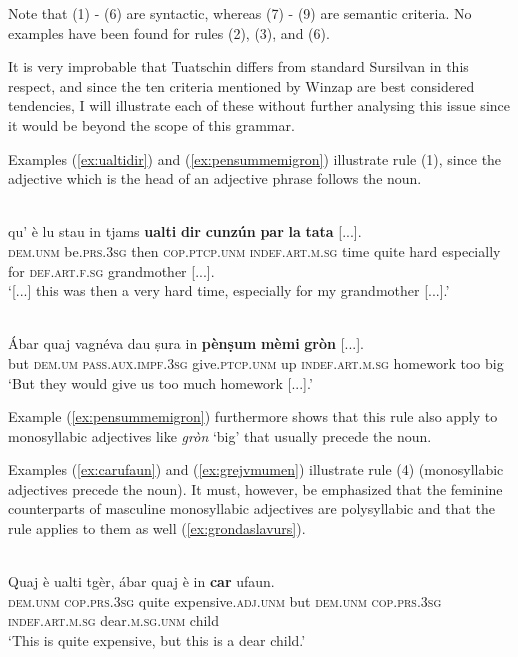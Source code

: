 Note that (1) - (6) are syntactic, whereas (7) - (9) are semantic criteria. No examples have been found for rules (2), (3), and (6).

It is very improbable that Tuatschin differs from standard Sursilvan in this respect, and since the ten criteria mentioned by Winzap are best considered tendencies, I will illustrate each of these without further analysing this issue since it would be beyond the scope of this grammar.

Examples (\ref{ex:ualtidir}) and (\ref{ex:pensummemigron}) illustrate rule (1), since the adjective which is the head of an adjective phrase follows the noun.
 
\ea
\label{ex:ualtidir}
\\
\gll  [...] qu’ è lu stau in tjams \textbf{ualti} \textbf{dir} \textbf{cunzún} \textbf{par} \textbf{la} \textbf{tata} [...]. \\
{} \textsc{dem.unm} be.\textsc{prs.3sg} then \textsc{cop.ptcp.unm} \textsc{indef.art.m.sg} time quite hard especially for \textsc{def.art.f.sg} grandmother [...].\\
\glt `[...] this was then a very hard time, especially for my grandmother [...].'
\z

\ea
\label{ex:pensummemigron}
\\
\gll  Ábar quaj vagnéva dau ṣura in \textbf{pènṣum} \textbf{mèmi} \textbf{gròn} [...].  \\
but \textsc{dem.um} \textsc{pass.aux.impf.3sg} give.\textsc{ptcp.unm} up \textsc{indef.art.m.sg} homework too big\\
\glt `But they would give us too much homework [...].'
\z

Example (\ref{ex:pensummemigron}) furthermore shows that this rule also apply to monosyllabic adjectives like \textit{gròn} `big' that usually precede the noun.

Examples (\ref{ex:carufaun}) and (\ref{ex:grejvmumen}) illustrate rule (4) (monosyllabic adjectives precede the noun). It must, however, be emphasized that the feminine counterparts of masculine monosyllabic adjectives are polysyllabic and that the rule applies to them as well (\ref{ex:grondaslavurs}).

\ea
\label{ex:carufaun}
\\
\gll Quaj è ualti tgèr, ábar quaj è in \textbf{car} ufaun.\\
\textsc{dem.unm} \textsc{cop.prs.3sg} quite expensive.\textsc{adj.unm} but \textsc{dem.unm} \textsc{cop.prs.3sg} \textsc{indef.art.m.sg} dear.\textsc{m.sg.unm} child\\
\glt `This is quite expensive, but this is a dear child.'
\z 

